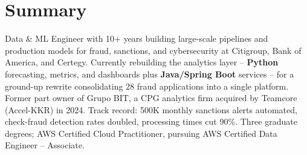 \section{Summary}
\vspace{-2pt}
\small{Data \& ML Engineer with 10+ years building large-scale pipelines and production models for fraud, sanctions, and cybersecurity at Citigroup, Bank of America, and Certegy. Currently rebuilding the analytics layer -- \textbf{Python} forecasting, metrics, and dashboards plus \textbf{Java/Spring Boot} services -- for a ground-up rewrite consolidating 28 fraud applications into a single platform. Former part owner of Grupo BIT, a CPG analytics firm acquired by Teamcore (Accel-KKR) in 2024. Track record: 500K monthly sanctions alerts automated, check-fraud detection rates doubled, processing times cut 90\%. Three graduate degrees; AWS Certified Cloud Practitioner, pursuing AWS Certified Data Engineer -- Associate.}
\vspace{-8pt}
